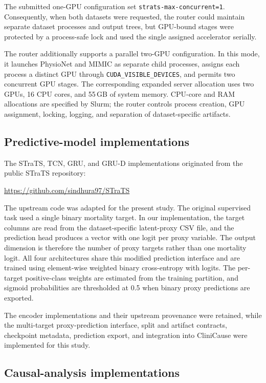 \documentclass[letterpaper,10pt]{article}
\begin{document}
The submitted one-GPU configuration set
\texttt{strats-max-concurrent=1}. Consequently, when both datasets were
requested, the router could maintain separate dataset processes and output
trees, but GPU-bound stages were protected by a process-safe lock and used the
single assigned accelerator serially.

The router additionally supports a parallel two-GPU configuration. In this
mode, it launches PhysioNet and MIMIC as separate child processes, assigns each
process a distinct GPU through \texttt{CUDA\_VISIBLE\_DEVICES}, and permits two
concurrent GPU stages. The corresponding expanded server allocation uses two
GPUs, 16 CPU cores, and 55\,GB of system memory. CPU-core and RAM allocations
are specified by Slurm; the router controls process creation, GPU assignment,
locking, logging, and separation of dataset-specific artifacts.

\subsection{Predictive-model implementations}

The STraTS, TCN, GRU, and GRU-D implementations originated from the public
STraTS repository:

\begin{center}
\url{https://github.com/sindhura97/STraTS}
\end{center}

The upstream code was adapted for the present study. The original supervised
task used a single binary mortality target. In our implementation, the target
columns are read from the dataset-specific latent-proxy CSV file, and the
prediction head produces a vector with one logit per proxy variable. The output
dimension is therefore the number of proxy targets rather than one mortality
logit. All four architectures share this modified prediction interface and are
trained using element-wise weighted binary cross-entropy with logits. The
per-target positive-class weights are estimated from the training partition,
and sigmoid probabilities are thresholded at 0.5 when binary proxy predictions
are exported.

The encoder implementations and their upstream provenance were retained, while
the multi-target proxy-prediction interface, split and artifact contracts,
checkpoint metadata, prediction export, and integration into CliniCause were
implemented for this study.

\subsection{Causal-analysis implementations}
\end{document}
